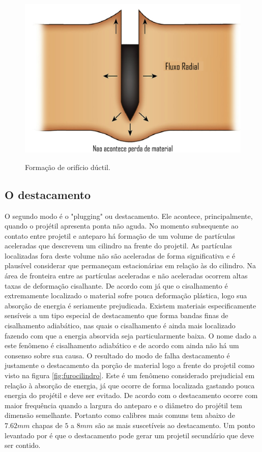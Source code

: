  \begin{figure}[H]
 	\centering
 	\caption{Formação de orifício dúctil.}
 	\includegraphics[width=0.5\linewidth]{images/Perfplast.png}
 	\label{fig:buracoductil}
 \end{figure}
 
 \subsection{O destacamento}
 
 O segundo modo é o "plugging" ou destacamento. Ele acontece, principalmente, quando o projétil apresenta ponta não aguda.  No momento subsequente ao contato entre projetil e anteparo há formação de um volume de partículas aceleradas que descrevem um cilindro na frente do projetil. As partículas localizadas fora deste volume não são aceleradas de forma significativa e é plausível considerar que permaneçam estacionárias em relação às do cilindro. Na área de fronteira entre as partículas aceleradas e não aceleradas ocorrem altas taxas de deformação cisalhante. De acordo com \cite{Crouch} já que o cisalhamento é extremamente localizado o material sofre pouca deformação plástica, logo sua absorção de energia é seriamente prejudicada. Existem materiais especificamente sensíveis a um tipo especial de destacamento que forma bandas finas de cisalhamento adiabático, nas quais o cisalhamento é ainda mais localizado fazendo com que a energia absorvida seja particularmente baixa. O nome dado a este fenômeno é cisalhamento adiabático e de acordo com \cite{Crouch} ainda não há um consenso sobre sua causa. O resultado do modo de falha destacamento é justamente o destacamento da porção de material logo a frente do projetil como visto na figura \ref{fig:furocilindro}. Este é um fenômeno considerado prejudicial em relação à absorção de energia, já que ocorre de forma localizada gastando pouca energia do projétil e  deve ser evitado. De acordo com \cite{Hazell} o destacamento ocorre com maior frequência quando a largura do anteparo e o diâmetro do projétil tem dimensão semelhante. Portanto como calibres mais comuns tem abaixo de $ 7.62mm $ chapas de $5$ a $ 8mm $ são as mais suscetíveis ao destacamento. Um ponto levantado por \cite{Crouch} é que o destacamento pode gerar um projetil secundário que deve ser contido. \\
 
